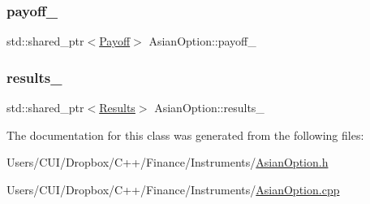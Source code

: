 \subsubsection{\texorpdfstring{payoff\+\_\+}{payoff\_}}
{\footnotesize\ttfamily std\+::shared\+\_\+ptr$<$\hyperlink{class_payoff}{Payoff}$>$ Asian\+Option\+::payoff\+\_\+\hspace{0.3cm}{\ttfamily [private]}}

\hypertarget{class_asian_option_aea29a8aff78cbe4101b4f060cedb6307}{}\label{class_asian_option_aea29a8aff78cbe4101b4f060cedb6307} 
\subsubsection{\texorpdfstring{results\+\_\+}{results\_}}
{\footnotesize\ttfamily std\+::shared\+\_\+ptr$<$\hyperlink{class_asian_option_1_1_results}{Results}$>$ Asian\+Option\+::results\+\_\+\hspace{0.3cm}{\ttfamily [private]}}



The documentation for this class was generated from the following files\+:\begin{DoxyCompactItemize}
\item 
Users/\+C\+U\+I/\+Dropbox/\+C++/\+Finance/\+Instruments/\hyperlink{_asian_option_8h}{Asian\+Option.\+h}\item 
Users/\+C\+U\+I/\+Dropbox/\+C++/\+Finance/\+Instruments/\hyperlink{_asian_option_8cpp}{Asian\+Option.\+cpp}\end{DoxyCompactItemize}
